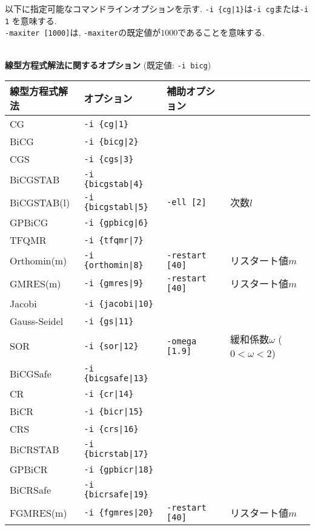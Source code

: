 \documentclass[a4paper]{jarticle}
\begin{document}
{{以下に指定可能なコマンドラインオプションを示す. \verb=-i {cg|1}=は\verb=-i cg=または\verb=-i 1=
を意味する. \\
\verb=-maxiter [1000]=は, \verb=-maxiter=の既定値が$1000$であることを意味する. 
\\
\\
\begin{minipage}[t]{\textwidth}
\begin{center}
{\bf 線型方程式解法に関するオプション} (既定値: \verb=-i bicg=) \\
\begin{tabular}{l|lll}\hline\hline
 線型方程式解法        & オプション              &  補助オプション  & \\ \hline
 CG          & \verb=-i {cg|1}=         &    \\ 
 BiCG        & \verb=-i {bicg|2}=       &    \\
 CGS         & \verb=-i {cgs|3}=        &    \\
 BiCGSTAB    & \verb=-i {bicgstab|4}=   &    \\
 BiCGSTAB(l) & \verb=-i {bicgstabl|5}=  & \verb=-ell [2]=      & 次数$l$ \\
 GPBiCG      & \verb=-i {gpbicg|6}=     &    \\
 TFQMR       & \verb=-i {tfqmr|7}=      &    \\
 Orthomin(m) & \verb=-i {orthomin|8}=   & \verb=-restart [40]= & リスタート値$m$  \\
 GMRES(m)    & \verb=-i {gmres|9}=      & \verb=-restart [40]= & リスタート値$m$  \\ 
 Jacobi      & \verb=-i {jacobi|10}=    &    \\
 Gauss-Seidel& \verb=-i {gs|11}=        &    \\
 SOR         & \verb=-i {sor|12}=       & \verb=-omega [1.9]=  & 緩和係数$\omega$ ($0<\omega<2$) \\
 BiCGSafe    & \verb=-i {bicgsafe|13}=  &    \\
 CR          & \verb=-i {cr|14}=        &    \\ 
 BiCR        & \verb=-i {bicr|15}=      &    \\
 CRS         & \verb=-i {crs|16}=       &    \\
 BiCRSTAB    & \verb=-i {bicrstab|17}=  &    \\
 GPBiCR      & \verb=-i {gpbicr|18}=    &    \\
 BiCRSafe    & \verb=-i {bicrsafe|19}=  &    \\
 FGMRES(m)   & \verb=-i {fgmres|20}=    & \verb=-restart [40]= & リスタート値$m$  \\ 

\end{tabular}
\end{center}
\end{minipage}}}
\end{document}
